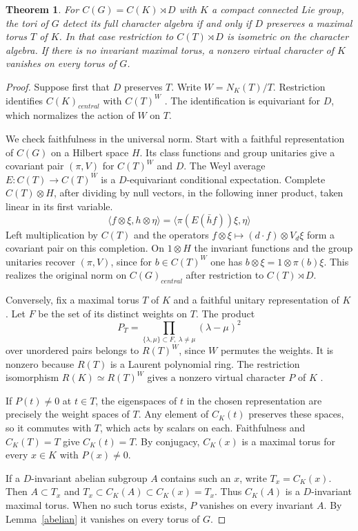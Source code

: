 \documentclass[11pt,a4paper]{article}
\newtheorem{thm}{Theorem}[section]
\theoremstyle{remark}
\begin{document}
\begin{thm}\label{weyl}
For $C(G)=C(K)\rtimes D$ with $K$ a compact connected Lie group, the
tori of $G$ detect its full character algebra if and only if $D$
preserves a maximal torus $T$ of $K$. In that case restriction to
$C(T)\rtimes D$ is isometric on the character algebra. If there is no
invariant maximal torus, a nonzero virtual character of $K$ vanishes
on every torus of $G$.
\end{thm}
\begin{proof}
Suppose first that $D$ preserves $T$. Write $W=N_K(T)/T$.
Restriction identifies $C(K)_{central}$ with $C(T)^W$ \cite{btd}. The
identification is equivariant for $D$, which normalizes the action of
$W$ on $T$.

We check faithfulness in the universal norm. Start with a faithful
representation of $C(G)$ on a Hilbert space $H$. Its class functions
and group unitaries give a covariant pair $(\pi,V)$ for $C(T)^W$ and $D$.
The Weyl average $E:C(T)\to C(T)^W$ is a $D$-equivariant conditional
expectation. Complete $C(T)\otimes H$, after dividing by null vectors,
in the following inner product, taken linear in its first variable.
\[
 \langle f\otimes\xi,h\otimes\eta\rangle
     =\langle\pi(E(\bar h f))\xi,\eta\rangle
\]
Left multiplication by $C(T)$ and the operators
$f\otimes\xi\mapsto (d\cdot f)\otimes V_d\xi$ form a covariant pair on
this completion. On $1\otimes H$ the invariant functions and the group
unitaries recover $(\pi,V)$, since for $b\in C(T)^W$ one has
$b\otimes\xi=1\otimes\pi(b)\xi$. This realizes the original norm on
$C(G)_{central}$ after restriction to $C(T)\rtimes D$.

Conversely, fix a maximal torus $T$ of $K$ and a faithful unitary
representation of $K$. Let $F$ be the set of its distinct weights on $T$.
The product
\[
 P_T=\prod_{\{\lambda,\mu\}\subset F,\ \lambda\ne\mu}
                      (\lambda-\mu)^2
\]
over unordered pairs belongs to $R(T)^W$, since $W$ permutes the weights.
It is nonzero because $R(T)$ is a Laurent polynomial ring. The
restriction isomorphism $R(K)\simeq R(T)^W$ gives a nonzero virtual
character $P$ of $K$ \cite{btd}.

If $P(t)\ne0$ at $t\in T$, the eigenspaces of $t$ in the chosen
representation are precisely the weight spaces of $T$. Any element of
$C_K(t)$ preserves these spaces, so it commutes with $T$, which acts
by scalars on each. Faithfulness and $C_K(T)=T$ give $C_K(t)=T$.
By conjugacy, $C_K(x)$ is a maximal torus for every $x\in K$ with
$P(x)\ne0$.

If a $D$-invariant abelian subgroup $A$ contains such an $x$, write
$T_x=C_K(x)$. Then $A\subset T_x$ and
$T_x\subset C_K(A)\subset C_K(x)=T_x$. Thus $C_K(A)$ is a
$D$-invariant maximal torus. When no such torus exists, $P$ vanishes
on every invariant $A$. By Lemma~\ref{abelian} it vanishes on every
torus of $G$.
\end{proof}
\end{document}
